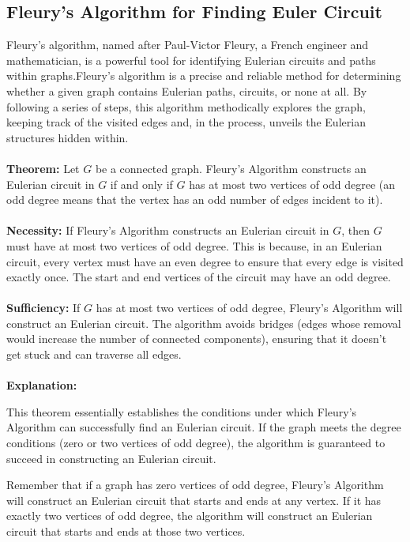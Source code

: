 \documentclass[14pt, times, a4paper]{extarticle}
\begin{document}
\subsection{Fleury’s Algorithm for Finding Euler Circuit}\cite{baeldung}
Fleury’s algorithm, named after Paul-Victor Fleury, a French engineer and mathematician, is a powerful tool for identifying Eulerian circuits and paths within graphs.Fleury’s algorithm is a precise and reliable method for determining whether a given graph contains Eulerian paths, circuits, or none at all. By following a series of steps, this algorithm methodically explores the graph, keeping track of the visited edges and, in the process, unveils the Eulerian structures hidden within.
\\
\\
\textbf{Theorem:}
Let $G$ be a connected graph. Fleury's Algorithm constructs an Eulerian circuit in $G$ if and only if $G$ has at most two vertices of odd degree (an odd degree means that the vertex has an odd number of edges incident to it).
\\
\\
{\bf Necessity:} If Fleury's Algorithm constructs an Eulerian circuit in $G$, then $G$ must have at most two vertices of odd degree. This is because, in an Eulerian circuit, every vertex must have an even degree to ensure that every edge is visited exactly once. The start and end vertices of the circuit may have an odd degree.
\\
\\
{\bf Sufficiency:} If $G$ has at most two vertices of odd degree, Fleury's Algorithm will construct an Eulerian circuit. The algorithm avoids bridges (edges whose removal would increase the number of connected components), ensuring that it doesn't get stuck and can traverse all edges.\\\\
\textbf{Explanation:}

This theorem essentially establishes the conditions under which Fleury's Algorithm can successfully find an Eulerian circuit. If the graph meets the degree conditions (zero or two vertices of odd degree), the algorithm is guaranteed to succeed in constructing an Eulerian circuit.

Remember that if a graph has zero vertices of odd degree, Fleury's Algorithm will construct an Eulerian circuit that starts and ends at any vertex. If it has exactly two vertices of odd degree, the algorithm will construct an Eulerian circuit that starts and ends at those two vertices.
\end{document}
